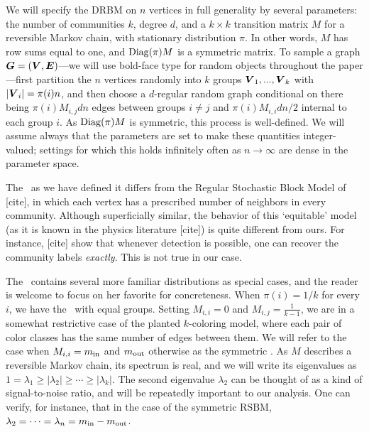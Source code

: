 We will specify the DRBM on $n$ vertices in full generality by several parameters: the number of communities $k$, degree $d$, and a $k\times k$ transition matrix $M$ for a reversible Markov chain, with stationary distribution $\pi$. In other words, $M$ has row sums equal to one, and $\operatorname{Diag}(\pi) M$ is a symmetric matrix. To sample a graph $\boldsymbol{G} = (\boldsymbol{V}, \boldsymbol{E})$---we will use bold-face type for random objects throughout the paper---first partition the $n$ vertices randomly into $k$ groups $\boldsymbol{V}_1,...,\boldsymbol{V}_k$ with $|\boldsymbol{V}_i| = \pi(i)n$, and then choose a $d$-regular random graph conditional on there being $\pi(i)M_{i,j} d n$ edges between groups $i\neq j$ and $\pi(i)M_{i,i} dn/2$ internal to each group $i$. As $\operatorname{Diag}(\pi) M$ is symmetric, this process is well-defined. We will assume always that the parameters are set to make these quantities integer-valued; settings for which this holds infinitely often as $n\to\infty$ are dense in the parameter space. 

\begin{remark}
	The \model~as we have defined it differs from the Regular Stochastic Block Model of [cite], in which each vertex has a prescribed number of neighbors in every community. Although superficially similar, the behavior of this `equitable' model (as it is known in the physics literature [cite]) is quite different from ours. For instance, [cite] show that whenever detection is possible, one can recover the community labels \emph{exactly}. This is not true in our case. 
\end{remark}

The \model~contains several more familiar distributions as special cases, and the reader is welcome to focus on her favorite for concreteness. When $\pi(i) = 1/k$ for every $i$, we have the \model~with equal groups. Setting $M_{i,i} = 0$ and $M_{i,j} = \tfrac{1}{k-1}$, we are in a somewhat restrictive case of the planted $k$-coloring model, where each pair of color classes has the same number of edges between them. We will refer to the case when $M_{i,i} = m_{\textup{in}}$ and $m_{\textup{out}}$ otherwise as the symmetric \model. As $M$ describes a reversible Markov chain, its spectrum is real, and we will write its eigenvalues as $1 = \lambda_1 \ge |\lambda_2| \ge \cdots \ge |\lambda_k|$. The second eigenvalue $\lambda_2$ can be thought of as a kind of signal-to-noise ratio, and will be repeatedly important to our analysis. One can verify, for instance, that in the case of the symmetric RSBM, $\lambda_2 = \cdots = \lambda_n = m_{\textup{in}} - m_{\textup{out}}$.

